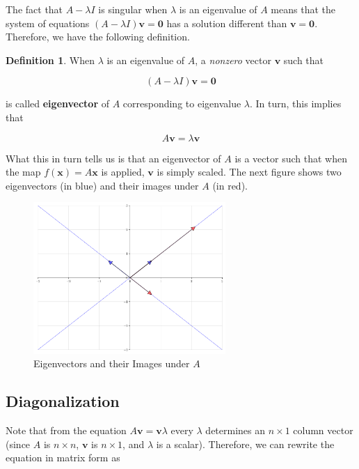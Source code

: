 \documentclass[a4paper,11pt]{article}
\theoremstyle{definition}
\newtheorem{definition}{Definition}
\theoremstyle{plain}
\begin{document}
The fact that \(A-\lambda I\) is singular when \(\lambda\) is an
eigenvalue of \(A\) means that the system of equations
\((A-\lambda I)\mathbf{v} = \mathbf{0}\) has a solution different than
\(\mathbf{v} = \mathbf{0}\). Therefore, we have the following definition.

\begin{definition}
When \(\lambda\) is an eigenvalue of \(A\), a \emph{nonzero} vector \(\mathbf{v}\) such that

\[
(A-\lambda I)\mathbf{v} = \mathbf{0}
\]

is called \textbf{eigenvector} of \(A\) corresponding to eigenvalue
\(\lambda\). In turn, this implies that

\[
A\mathbf{v} = \lambda \mathbf{v}
\]
\end{definition}

What this in turn tells us is that an eigenvector of \(A\) is a vector
such that when the map \(f(\mathbf{x}) = A\mathbf{x}\) is applied,
\(\mathbf{v}\) is simply scaled. The next figure shows two eigenvectors
(in blue) and their images under \(A\) (in red).

    \begin{figure}[htbp]
    	\centering 
    		\includegraphics[width = 0.65\textwidth]{Ch4_files/Ch4_18_0.pdf}
    		\caption{Eigenvectors and their Images under $A$}
    		\label{fig:eigenvectors}
    \end{figure}
    
\subsection{Diagonalization}\label{diagonalization}

Note that from the equation \(A\mathbf{v} = \mathbf{v}\lambda\) every
\(\lambda\) determines an \(n\times 1\) column vector (since \(A\) is
\(n\times n\), \(\mathbf{v}\) is \(n\times 1\), and \(\lambda\) is a
scalar). Therefore, we can rewrite the equation in matrix form as
\end{document}
